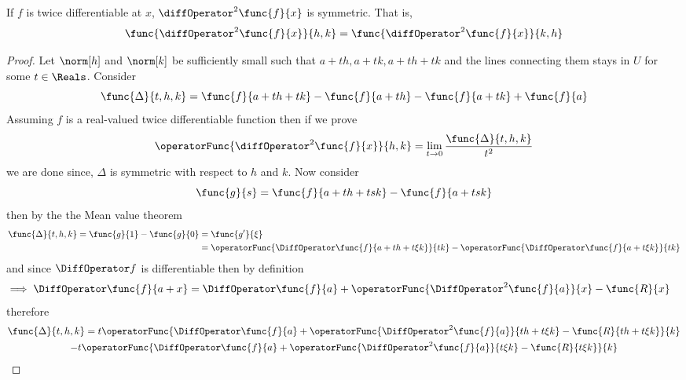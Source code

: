 \begin{theorem}
    If \(f\) is twice differentiable at \(x\), \(\diffOperator^2 \func{f}{x}\) is symmetric. That is,
    \begin{equation*}
        \func{\diffOperator^2 \func{f}{x}}{h,k} = \func{\diffOperator^2 \func{f}{x}}{k,h}
    \end{equation*}
\end{theorem}

\begin{proof}
    Let \(\norm[h]\) and \(\norm[k]\) be sufficiently small such that \(a + th, a+  tk , a+th + tk\) and the lines connecting them stays in \(U\) for some \(t \in \Reals\). Consider
    \begin{equation*}
        \func{\Delta}{t,h,k} = \func{f}{a + th + tk} - \func{f}{a + th} - \func{f}{a  + tk} + \func{f}{a}
    \end{equation*}
    Assuming \(f\) is a real-valued twice differentiable function then if we prove
    \begin{equation*}
        \operatorFunc{\diffOperator^2 \func{f}{x}}{h,k} = \lim_{t \to 0} \dfrac{\func{\Delta}{t,h,k}}{t^2}
    \end{equation*}
    we are done since, \(\Delta\) is symmetric with respect to \(h\) and \(k\). Now consider
    \begin{equation*}
        \func{g}{s} = \func{f}{a + th + tsk} - \func{f}{a  + tsk}
    \end{equation*}
    then by the the Mean value theorem
    \begin{align*}
        \func{\Delta}{t,h,k} = \func{g}{1} - \func{g}{0} & = \func{g'}{\xi}                                                                                                       \\
                                                         & =\operatorFunc{ \DiffOperator \func{f}{a + th + t\xi k}}{tk} - \operatorFunc{ \DiffOperator \func{f}{a  + t\xi k}}{tk}
    \end{align*}
    and since \(\DiffOperator f\) is differentiable then by definition
    \begin{align*}
        \implies \DiffOperator \func{f}{a+x} & = \DiffOperator \func{f}{a} + \operatorFunc{\DiffOperator^2 \func{f}{a}}{x} - \func{R}{x}
    \end{align*}
    therefore
    \begin{multline*}
        \func{\Delta}{t,h,k} = t\operatorFunc{\DiffOperator \func{f}{a } + \operatorFunc{\DiffOperator^2 \func{f}{a}}{th + t\xi k} - \func{R}{th + t\xi k}}{k} \\- t\operatorFunc{\DiffOperator \func{f}{a} + \operatorFunc{\DiffOperator^2 \func{f}{a}}{t\xi k} - \func{R}{t\xi k}}{k}

\end{multline*}
\end{proof}
